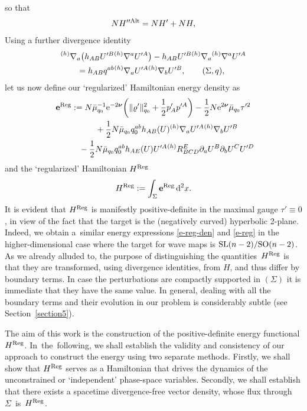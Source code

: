 \documentclass[11pt]{article}
\numberwithin{equation}{section}
\def\ptl{\partial}%
\def\mbo#1{\boldsymbol{#1}}%
\def\grad{{\nabla}}%
\newcommand{\leftexp}[2]{{\vphantom{#2}}^{#1}{#2}}
\def\halb{\frac{1}{2}}%
\numberwithin{equation}{section}
\begin{document}
so that
\begin{align}
NH''^{{\rm Alt}} = NH' + NH,
\end{align}
\fi
Using a further divergence identity
\begin{align*}
& \leftexp{(h)}{\grad}_a \bigl(h_{AB} U'^B \leftexp{(h)}{\grad} ^a U'^A\bigr) - h_{AB} U'^B \leftexp{(h)}{\grad}_a \leftexp{(h)}{\grad}^a U'^A \notag\\
&\qquad{}= h_{AB} q^{ab} \leftexp{(h)}{\grad}_a U'^A \leftexp{(h)}{\grad}_b U'^B, \qquad (\Sigma, q),
\end{align*}
let us now define our `regularized' Hamiltonian energy density as
\begin{gather}
\mathbf{e}^{{\rm Reg}} := N \bar{\mu}^{-1}_{q_0} {\rm e}^{-2 \mbo{\nu}} \biggl(\Vert \varrho' \Vert^2_{q_0} + \halb p'_A p'^A \biggr) - \halb N {\rm e}^{2 \mbo{\nu}} \bar{\mu}_{q_0} \tau'^2 \notag\\ \hphantom{\mathbf{e}^{{\rm Reg}} :=}{}
+ \halb N \bar{\mu}_{q_0} q_0^{ab} h_{AB}(U) \leftexp{(h)}{\grad}_a U'^A \leftexp{(h)}{\grad}_b U'^B \notag\\ \hphantom{\mathbf{e}^{{\rm Reg}} :=}{}
- \halb N \bar{\mu}_{q_0} q^{ab}_0 h_{AE} (U) U'^A \leftexp{(h)}R^E _{BCD} \ptl_a U^B \ptl_b U^C U'^D \label{e-reg-den}
\end{gather}
and the `regularized' Hamiltonian $H^{{\rm Reg}}$
\begin{align} \label{e-reg}
H^{{\rm Reg}} := \int_{\Sigma} \mathbf{e}^{{\rm Reg}} \, {\rm d}^2 x.
\end{align}
It is evident that $H^{{\rm Reg}}$ is manifestly positive-definite in the maximal gauge $\tau' \equiv 0$, in view of the fact that the target is the (negatively curved) hyperbolic 2-plane. Indeed, we obtain a~similar energy expressions \eqref{e-reg-den} and \eqref{e-reg} in the higher-dimensional case where the target for wave maps is ${\rm SL}(n-2)/{\rm SO}(n-2)$.
As we already alluded to, the purpose of distinguishing the quantities~$H^{{\rm Reg}}$ is that they are transformed, using divergence identities, from $H$, and thus differ by boundary terms. In case the perturbations are compactly supported in $(\Sigma)$ it is immediate that they have the same value. In general, dealing with all the boundary terms and their evolution in our problem is considerably subtle (see Section~\ref{section5}).

 The aim of this work is the construction of the positive-definite energy functional $H^{{\rm Reg}}$. In~the~following, we shall establish the validity and consistency of our approach to construct the energy using two separate methods. Firstly, we shall show that $H^{{\rm Reg}}$ serves as a Hamiltonian that drives the dynamics of the unconstrained or `independent' phase-space variables. Secondly, we shall establish that there exists a spacetime divergence-free vector density, whose flux through~$\Sigma$~is~$H^{{\rm Reg}}$.
\end{document}
